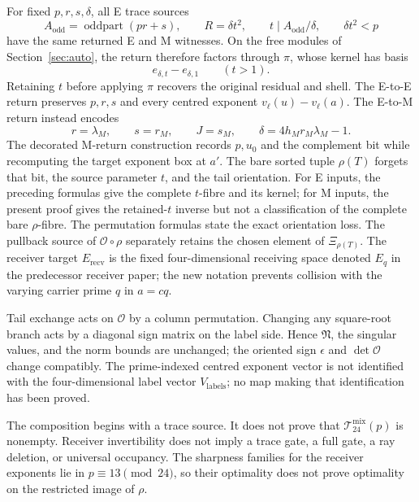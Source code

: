 For fixed \(p,r,s,\delta\), all E trace sources
\[
 A_{\mathrm{odd}}=\operatorname{oddpart}(pr+s),\qquad
 R=\delta t^2,\qquad t\mid A_{\mathrm{odd}}/\delta,
 \qquad \delta t^2<p
\]
have the same returned E and M witnesses.  On the free modules of
Section~\ref{sec:auto}, the return therefore factors through \(\pi\), whose
kernel has basis
\[
 e_{\delta,t}-e_{\delta,1}\qquad(t>1).
\]
Retaining \(t\) before applying \(\pi\) recovers the original residual and
shell.  The E-to-E return preserves \(p,r,s\) and every centred exponent
\(v_\ell(u)-v_\ell(a)\).  The E-to-M return instead encodes
\[
 r=\lambda_M,\qquad s=r_M,\qquad J=s_M,\qquad
 \delta=4h_Mr_M\lambda_M-1.
\]
The decorated M-return construction records \(p,u_0\) and the complement bit
while recomputing the target exponent box at \(a'\).  The bare sorted tuple
\(\rho(T)\) forgets that bit, the source parameter \(t\), and the tail
orientation. For E inputs, the preceding formulas give the complete
\(t\)-fibre and its kernel; for M inputs, the present proof gives the
retained-\(t\) inverse but not a classification of the complete bare
\(\rho\)-fibre. The permutation formulas state the exact orientation loss.
The pullback source of \(\mathscr O\circ\rho\) separately retains the chosen
element of \(\Xi_{\rho(T)}\). The receiver target
\(E_{\mathrm{recv}}\) is the fixed four-dimensional receiving space denoted
\(E_q\) in the predecessor receiver paper; the new notation prevents
collision with the varying carrier prime \(q\) in \(a=cq\).

Tail exchange acts on \(\mathscr O\) by a column permutation.  Changing any
square-root branch acts by a diagonal sign matrix on the label side.  Hence
\(\mathfrak N\), the singular values, and the norm bounds are unchanged;
the oriented sign \(\epsilon\) and \(\det\mathscr O\) change compatibly.
The prime-indexed centred exponent vector is not identified with the
four-dimensional label vector \(V_{\mathrm{labels}}\); no map making that identification
has been proved.

The composition begins with a trace source.  It does not prove that
\(\mathcal T_{24}^{\mathrm{mix}}(p)\) is nonempty.  Receiver invertibility
does not imply a trace gate, a full gate, a ray deletion, or universal
occupancy.  The sharpness families for the receiver exponents lie in
\(p\equiv13\pmod{24}\), so their optimality does not prove optimality on the
restricted image of \(\rho\).


